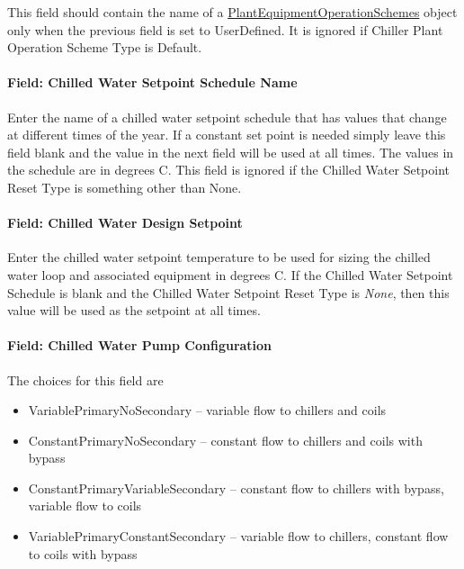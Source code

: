 This field should contain the name of a \hyperref[plantequipmentoperationschemes]{PlantEquipmentOperationSchemes} object only when the previous field is set to UserDefined. It is ignored if Chiller Plant Operation Scheme Type is Default.

\paragraph{Field: Chilled Water Setpoint Schedule Name}\label{field-chilled-water-setpoint-schedule-name}

Enter the name of a chilled water setpoint schedule that has values that change at different times of the year. If a constant set point is needed simply leave this field blank and the value in the next field will be used at all times. The values in the schedule are in degrees C. This field is ignored if the Chilled Water Setpoint Reset Type is something other than None.

\paragraph{Field: Chilled Water Design Setpoint}\label{field-chilled-water-design-setpoint}

Enter the chilled water setpoint temperature to be used for sizing the chilled water loop and associated equipment in degrees C. If the Chilled Water Setpoint Schedule is blank and the Chilled Water Setpoint Reset Type is \emph{None}, then this value will be used as the setpoint at all times.

\paragraph{Field: Chilled Water Pump Configuration}\label{field-chilled-water-pump-configuration}

The choices for this field are

\begin{itemize}
\item
  VariablePrimaryNoSecondary -- variable flow to chillers and coils
\item
  ConstantPrimaryNoSecondary -- constant flow to chillers and coils with bypass
\item
  ConstantPrimaryVariableSecondary -- constant flow to chillers with bypass, variable flow to coils
\item
  VariablePrimaryConstantSecondary -- variable flow to chillers, constant flow to coils with bypass
\end{itemize}

